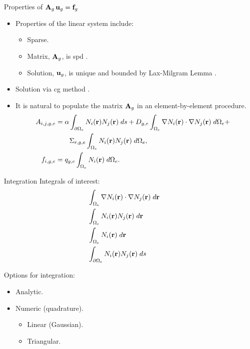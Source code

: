 \begin{frame}{Properties of $\mathbf{A}_g \, \mathbf{u}_g = \mathbf{f}_g$}
  \begin{itemize}
    \item Properties of the linear system include:
      \begin{itemize}
        \item Sparse.
        \item Matrix, $\mathbf{A}_g$, is \gls{spd} \cite{textbookhughes}.
        \item Solution, $\mathbf{u}_g$, is unique and bounded by Lax-Milgram Lemma 
          \cite{textbookli}.
      \end{itemize}
    \item Solution via \gls{cg} method \cite{Kelley1995IterativeEquations}.
    \item It is natural to populate the matrix $\mathbf{A}_g$ in an element-by-element 
      procedure.
      \begin{align}
        \label{eq:matrix_population}
        A_{i,j,g,e} &= \alpha \int_{\partial \Omega_e} N_i(\mathbf{r}) 
          N_j(\mathbf{r}) \; ds + D_{g,e} 
          \int_{\Omega_e} \mathbf{\nabla} N_i(\mathbf{r}) \cdot \mathbf{\nabla} N_j(\mathbf{r}) \;
          d\Omega_e + \\
        &\qquad \Sigma_{r,g,e} \int_{\Omega_e} N_i(\mathbf{r}) N_j(\mathbf{r})
          \; d\Omega_e, \\
        \label{eq:vector_population}
        f_{i,g,e} &= q_{g,e} \int_{\Omega_e} N_i(\mathbf{r}) \;d\Omega_e.
      \end{align}
  \end{itemize}
\end{frame}

\begin{frame}{Integration}
  Integrals of interest:
  \begin{align}
    &\int_{\Omega_e} \mathbf{\nabla} N_i(\mathbf{r}) \cdot \mathbf{\nabla} N_j(\mathbf{r}) 
      \;d\mathbf{r} \\
    &\int_{\Omega_e} N_i(\mathbf{r}) N_j(\mathbf{r}) \;d\mathbf{r} \\
    &\int_{\Omega_e} N_i(\mathbf{r}) \;d\mathbf{r} \\
    &\int_{\partial \Omega_e} N_i(\mathbf{r}) N_j(\mathbf{r}) \;ds &
  \end{align}

  Options for integration:
  \begin{itemize}
    \item Analytic.
    \item Numeric (quadrature).
    \begin{itemize}
      \item Linear (Gaussian).
      \item Triangular.
    \end{itemize}
  \end{itemize}
\end{frame}

